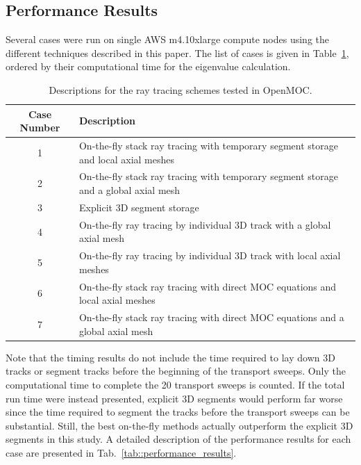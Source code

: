 \subsection{Performance Results}
Several cases were run on single AWS m4.10xlarge compute nodes using the different techniques described in this paper. The list of cases is given in Table~\ref{tab::cases}, ordered by their computational time for the eigenvalue calculation. 

\begin{table}[ht]
	\centering
	\caption{Descriptions for the ray tracing schemes tested in OpenMOC.}
	\begin{tabular}{c m{10cm}}
		\toprule
		\textbf{Case Number} & \textbf{Description} \\
		\midrule
		1 & On-the-fly stack ray tracing with temporary segment storage and local axial meshes \\
		2 & On-the-fly stack ray tracing with temporary segment storage and a global axial mesh \\
		3 & Explicit 3D segment storage \\
		4 & On-the-fly ray tracing by individual 3D track with a global axial mesh\\
		5 &On-the-fly ray tracing by individual 3D track with local axial meshes\\
		6 & On-the-fly stack ray tracing with direct MOC equations and local axial meshes \\
		7 & On-the-fly stack ray tracing with direct MOC equations and a global axial mesh \\
		\bottomrule
	\end{tabular}
	\label{tab::cases}
\end{table}


Note that the timing results do not include the time required to lay down 3D tracks or segment tracks before the beginning of the transport sweeps. Only the computational time to complete the 20 transport sweeps is counted. If the total run time were instead presented, explicit 3D segments would perform far worse since the time required to segment the tracks before the transport sweeps can be substantial. Still, the best on-the-fly methods actually outperform the explicit 3D segments in this study. A detailed description of the performance results for each case are presented in Tab.~\ref{tab::performance_results}.


